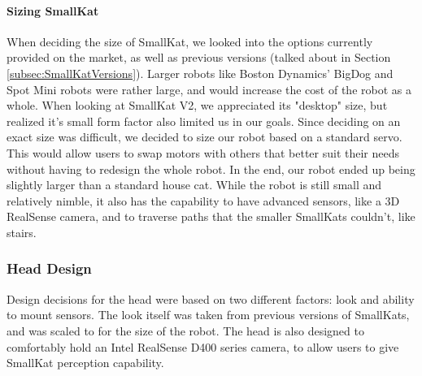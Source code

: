          
         
         
         \paragraph{Sizing SmallKat}
            When deciding the size of SmallKat, we looked into the options currently provided on the market, as well as previous versions (talked about in Section \ref{subsec:SmallKatVersions}). Larger robots like Boston Dynamics' BigDog and Spot Mini robots were rather large, and would increase the cost of the robot as a whole. When looking at SmallKat V2, we appreciated its "desktop" size, but realized it's small form factor also limited us in our goals. Since deciding on an exact size was difficult, we decided to size our robot based on a standard servo. This would allow users to swap motors with others that better suit their needs without having to redesign the whole robot. In the end, our robot ended up being slightly larger than a standard house cat. While the robot is still small and relatively nimble, it also has the capability to have advanced sensors, like a 3D RealSense camera, and to traverse paths that the smaller SmallKats couldn't, like stairs. 

        \subsubsection{Head Design}
            Design decisions for the head were based on two different factors: look and ability to mount sensors. The look itself was taken from previous versions of SmallKats, and was scaled to for the size of the robot. The head is also designed to comfortably hold an Intel RealSense D400 series camera, to allow users to give SmallKat perception capability.

 
                
        
    
        
